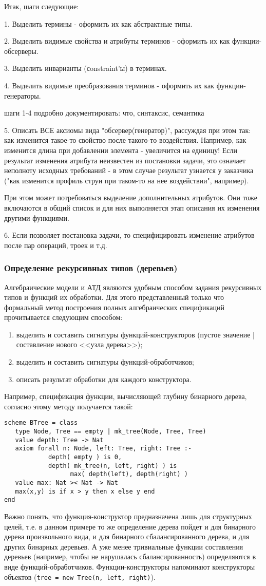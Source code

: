 \documentclass[14pt, twoside]{extreport}
\newcommand{\head}[1]{\vspace{1cm}\subsubsection*{#1}}
\begin{document}
Итак, шаги следующие:

1. Выделить термины - оформить их как абстрактные типы.

2. Выделить видимые свойства и атрибуты терминов - оформить их как функции-обсерверы.

3. Выделить инварианты (сonstraint'ы) в терминах.

4. Выделить видимые преобразования терминов - оформить их как функции-генераторы.

шаги 1-4 подробно документировать: что, синтаксис, семантика

5. Описать ВСЕ аксиомы вида "обсервер(генератор)", рассуждая при этом так: как изменится такое-то свойство после такого-то воздействия. Например, как изменится длина при добавлении элемента - увеличится на единицу! Если результат изменения атрибута неизвестен из постановки задачи, это означает неполноту исходных требований - в этом случае результат узнается у заказчика ("как изменится профиль струи при таком-то на нее воздействии", например).

При этом может потребоваться выделение дополнительных атрибутов. Они тоже включаются в общий список и для них выполняется этап описания их изменения другими функциями.

6. Если позволяет постановка задачи, то специфицировать изменение атрибутов после пар операций, троек и т.д.


\head{Определение рекурсивных типов (деревьев)}
Алгебраические модели и АТД являются удобным способом задания рекурсивных типов и функций их обработки. Для этого представленный только что формальный метод построения полных алгебраических спецификаций прочитывается следующим способом:
\begin{enumerate}
  \item выделить и составить сигнатуры функций-конструкторов (пустое значение | составление нового <<узла дерева>>);
  \item выделить и составить сигнатуры функций-обработчиков;
  \item описать результат обработки для каждого конструктора.
\end{enumerate}
Например, спецификация функции, вычисляющей глубину бинарного дерева, согласно этому методу получается такой:
\begin{lstlisting}
scheme BTree = class
   type Node, Tree == empty | mk_tree(Node, Tree, Tree)
   value depth: Tree -> Nat
   axiom forall n: Node, left: Tree, right: Tree :-
            depth( empty ) is 0,
            depth( mk_tree(n, left, right) ) is
                  max( depth(left), depth(right) )
   value max: Nat >< Nat -> Nat
   max(x,y) is if x > y then x else y end
end
\end{lstlisting}
Важно понять, что функция-конструктор предназначена лишь для структурных целей, т.е. в данном примере то же определение дерева пойдет и для бинарного дерева произвольного вида, и для бинарного сбалансированного дерева, и для других бинарных деревьев. А уже менее тривиальные функции составления деревьев (например, чтобы не нарушалась сбалансированность) определяются в виде функций-обработчиков. Функции-конструкторы напоминают конструкторы объектов (\texttt{tree = new Tree(n, left, right)}).
\end{document}
